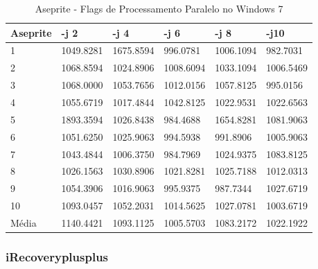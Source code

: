 \begin{table}[!ht]
\centering
\caption{Aseprite - Flags de Processamento Paralelo no Windows 7}
\label{tab:flag_processamento_paralelo:windows:aseprite}
\begin{tabular}{llllll}
\textbf{Aseprite} & \textbf{-j 2} & \textbf{-j 4} & \textbf{-j 6} & \textbf{-j 8} & \textbf{-j10}  \\ \toprule
1                 & 1049.8281     &   1675.8594   &   996.0781    &   1006.1094   &   982.7031     \\ 
2                 & 1068.8594     &   1024.8906   &   1008.6094   &   1033.1094   &   1006.5469    \\ 
3                 & 1068.0000     &   1053.7656   &   1012.0156   &   1057.8125   &   995.0156     \\ 
4                 & 1055.6719     &   1017.4844   &   1042.8125   &   1022.9531   &   1022.6563    \\ 
5                 & 1893.3594     &   1026.8438   &   984.4688    &   1654.8281   &   1081.9063    \\ 
6                 & 1051.6250     &   1025.9063   &   994.5938    &   991.8906    &   1005.9063    \\ 
7                 & 1043.4844     &   1006.3750   &   984.7969    &   1024.9375   &   1083.8125    \\ 
8                 & 1026.1563     &   1030.8906   &   1021.8281   &   1025.7188   &   1012.0313    \\ 
9                 & 1054.3906     &   1016.9063   &   995.9375    &   987.7344    &   1027.6719    \\ 
10                & 1093.0457     &   1052.2031   &   1014.5625   &   1027.0781   &   1003.6719    \\ \bottomrule
Média             & 1140.4421     &   1093.1125   &   1005.5703   &   1083.2172   &   1022.1922    \\ 
\end{tabular}
\end{table}

\clearpage
\subsubsection*{iRecoveryplusplus}

